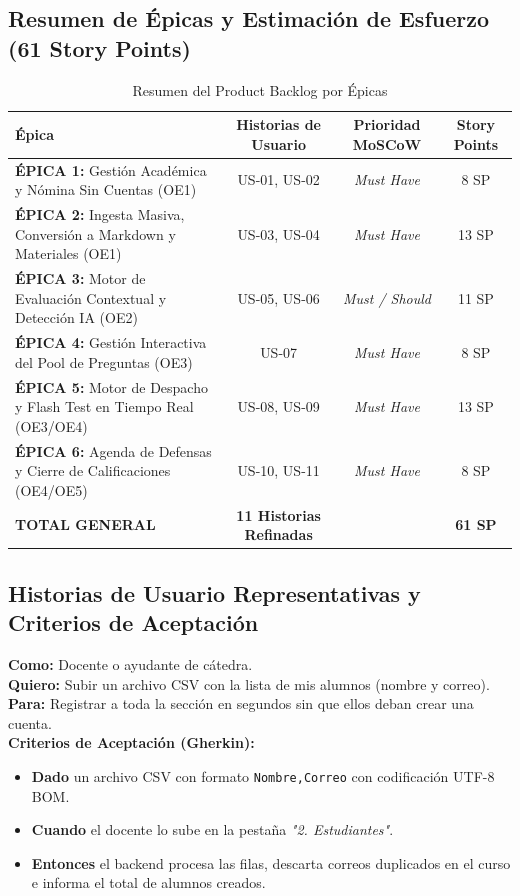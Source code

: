 \documentclass[11pt,a4paper]{article}
\begin{document}
\subsection{Resumen de Épicas y Estimación de Esfuerzo (61 Story Points)}

\begin{table}[h!]
\centering
\begin{tabularx}{\textwidth}{X c c c}
\toprule
\textbf{Épica} & \textbf{Historias de Usuario} & \textbf{Prioridad MoSCoW} & \textbf{Story Points} \\
\midrule
\textbf{ÉPICA 1:} Gestión Académica y Nómina Sin Cuentas (OE1) & US-01, US-02 & \textit{Must Have} & 8 SP \\
\textbf{ÉPICA 2:} Ingesta Masiva, Conversión a Markdown y Materiales (OE1) & US-03, US-04 & \textit{Must Have} & 13 SP \\
\textbf{ÉPICA 3:} Motor de Evaluación Contextual y Detección IA (OE2) & US-05, US-06 & \textit{Must / Should} & 11 SP \\
\textbf{ÉPICA 4:} Gestión Interactiva del Pool de Preguntas (OE3) & US-07 & \textit{Must Have} & 8 SP \\
\textbf{ÉPICA 5:} Motor de Despacho y Flash Test en Tiempo Real (OE3/OE4) & US-08, US-09 & \textit{Must Have} & 13 SP \\
\textbf{ÉPICA 6:} Agenda de Defensas y Cierre de Calificaciones (OE4/OE5) & US-10, US-11 & \textit{Must Have} & 8 SP \\
\midrule
\textbf{TOTAL GENERAL} & \textbf{11 Historias Refinadas} & & \textbf{61 SP} \\
\bottomrule
\end{tabularx}
\caption{Resumen del Product Backlog por Épicas}
\end{table}

\subsection{Historias de Usuario Representativas y Criterios de Aceptación}

\begin{tcolorbox}[title=US-02: Importación de Estudiantes vía CSV (Épica 1 — 5 SP)]
\textbf{Como:} Docente o ayudante de cátedra.\\
\textbf{Quiero:} Subir un archivo CSV con la lista de mis alumnos (nombre y correo).\\
\textbf{Para:} Registrar a toda la sección en segundos sin que ellos deban crear una cuenta.\\
\textbf{Criterios de Aceptación (Gherkin):}
\begin{itemize}
    \item \textbf{Dado} un archivo CSV con formato \texttt{Nombre,Correo} con codificación UTF-8 BOM.
    \item \textbf{Cuando} el docente lo sube en la pestaña \textit{"2. Estudiantes"}.
    \item \textbf{Entonces} el backend procesa las filas, descarta correos duplicados en el curso e informa el total de alumnos creados.
\end{itemize}
\end{tcolorbox}
\end{document}
